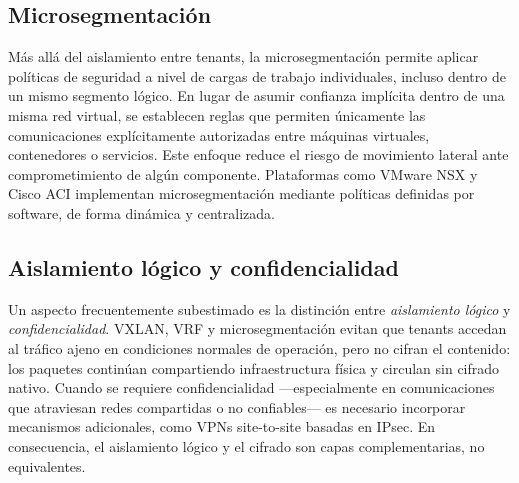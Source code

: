 \subsection{Microsegmentación}

Más allá del aislamiento entre tenants, la microsegmentación permite aplicar políticas de seguridad a nivel de cargas de trabajo individuales, incluso dentro de un mismo segmento lógico. En lugar de asumir confianza implícita dentro de una misma red virtual, se establecen reglas que permiten únicamente las comunicaciones explícitamente autorizadas entre máquinas virtuales, contenedores o servicios. Este enfoque reduce el riesgo de movimiento lateral ante comprometimiento de algún componente. Plataformas como VMware NSX y Cisco ACI implementan microsegmentación mediante políticas definidas por software, de forma dinámica y centralizada.

\subsection{Aislamiento lógico y confidencialidad}

Un aspecto frecuentemente subestimado es la distinción entre \textit{aislamiento lógico} y \textit{confidencialidad}. VXLAN, VRF y microsegmentación evitan que tenants accedan al tráfico ajeno en condiciones normales de operación, pero no cifran el contenido: los paquetes continúan compartiendo infraestructura física y circulan sin cifrado nativo. Cuando se requiere confidencialidad —especialmente en comunicaciones que atraviesan redes compartidas o no confiables— es necesario incorporar mecanismos adicionales, como VPNs site-to-site basadas en IPsec. En consecuencia, el aislamiento lógico y el cifrado son capas complementarias, no equivalentes.
